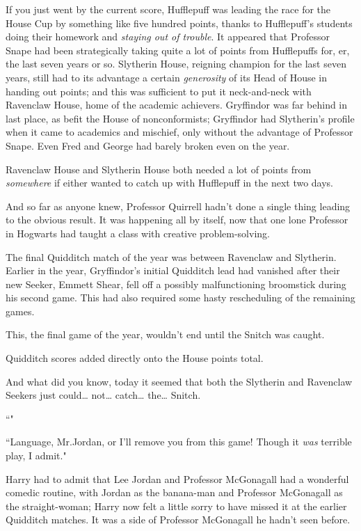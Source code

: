 If you just went by the current score, Hufflepuff was leading the race for the House Cup by something like five hundred points, thanks to Hufflepuff's students doing their homework and \emph{staying out of trouble}. It appeared that Professor Snape had been strategically taking quite a lot of points from Hufflepuffs for, er, the last seven years or so. Slytherin House, reigning champion for the last seven years, still had to its advantage a certain \emph{generosity} of its Head of House in handing out points; and this was sufficient to put it neck-and-neck with Ravenclaw House, home of the academic achievers. Gryffindor was far behind in last place, as befit the House of nonconformists; Gryffindor had Slytherin's profile when it came to academics and mischief, only without the advantage of Professor Snape. Even Fred and George had barely broken even on the year.

Ravenclaw House and Slytherin House both needed a lot of points from \emph{somewhere} if either wanted to catch up with Hufflepuff in the next two days.

And so far as anyone knew, Professor Quirrell hadn't done a single thing leading to the obvious result. It was happening all by itself, now that one lone Professor in Hogwarts had taught a class with creative problem-solving.

The final Quidditch match of the year was between Ravenclaw and Slytherin. Earlier in the year, Gryffindor's initial Quidditch lead had vanished after their new Seeker, Emmett Shear, fell off a possibly malfunctioning broomstick during his second game. This had also required some hasty rescheduling of the remaining games.

This, the final game of the year, wouldn't end until the Snitch was caught.

Quidditch scores added directly onto the House points total.

And what did you know, today it seemed that both the Slytherin and Ravenclaw Seekers just could{\ldots} not{\ldots} catch{\ldots} the{\ldots} Snitch.

``"

``Language, Mr.\?Jordan, or I'll remove you from this game! Though it \emph{was} terrible play, I admit."

Harry had to admit that Lee Jordan and Professor McGonagall had a wonderful comedic routine, with Jordan as the banana-man and Professor McGonagall as the straight-woman; Harry now felt a little sorry to have missed it at the earlier Quidditch matches. It was a side of Professor McGonagall he hadn't seen before.

